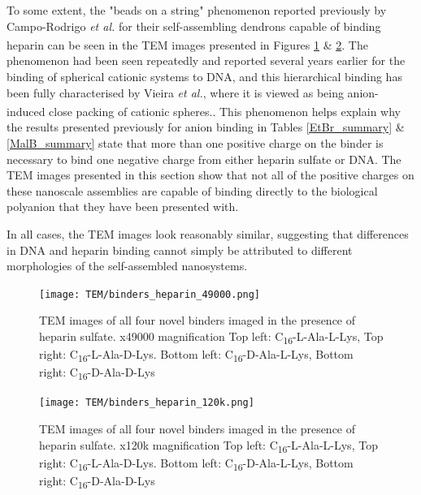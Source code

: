 To some extent, the "beads on a string" phenomenon reported previously by Campo-Rodrigo \textit{et al.} for their self-assembling dendrons capable of binding heparin can be seen in the TEM images presented in Figures \ref{TEM_heparin1} \& \ref{TEM_heparin2}.\textsuperscript{\cite{Rodrigo2011Self-AssemblingBinding}} The phenomenon had been seen repeatedly and reported several years earlier for the binding of spherical cationic systems to DNA, and this hierarchical binding has been fully characterised by Vieira \textit{et al.}, where it is viewed as being anion-induced close packing of cationic spheres.\textsuperscript{\cite{Vieira2017EmergenceHeparin,Wong2007AnLength}}. This phenomenon helps explain why the results presented previously for anion binding in Tables \ref{EtBr_summary} \& \ref{MalB_summary} state that more than one positive charge on the binder is necessary to bind one negative charge from either heparin sulfate or DNA. The TEM images presented in this section show that not all of the positive charges on these nanoscale assemblies are capable of binding directly to the biological polyanion that they have been presented with. 

In all cases, the TEM images look reasonably similar, suggesting that differences in DNA and heparin binding cannot simply be attributed to different morphologies of the self-assembled nanosystems.

\newpage
\begin{figure} [h!]
\centering
\texttt{[image: TEM/binders\_heparin\_49000.png]}
\caption{TEM images of all four novel binders imaged in the presence of heparin sulfate. x49000 magnification
Top left: C\textsubscript{16}-L-Ala-L-Lys, Top right: C\textsubscript{16}-L-Ala-D-Lys. Bottom left: C\textsubscript{16}-D-Ala-L-Lys, Bottom right: C\textsubscript{16}-D-Ala-D-Lys}
\label{TEM_heparin1}
\end{figure}

\newpage
\begin{figure} [h!]
\centering
\texttt{[image: TEM/binders\_heparin\_120k.png]}
\caption{TEM images of all four novel binders imaged in the presence of heparin sulfate. x120k magnification
Top left: C\textsubscript{16}-L-Ala-L-Lys, Top right: C\textsubscript{16}-L-Ala-D-Lys. Bottom left: C\textsubscript{16}-D-Ala-L-Lys, Bottom right: C\textsubscript{16}-D-Ala-D-Lys}
\label{TEM_heparin2}
\end{figure}
\newpage


